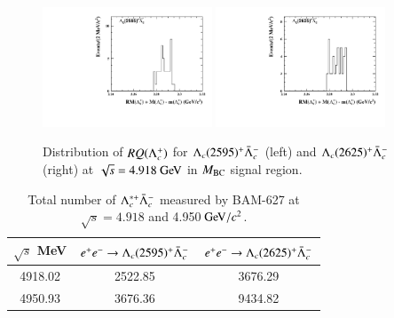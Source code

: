 \begin{figure}[H]\centering
    \includegraphics[width=0.45\textwidth]{figure/app_lcst/output_Lc2595_4914_rm_lmdc.pdf}
    \includegraphics[width=0.45\textwidth]{figure/app_lcst/output_Lc2625_4914_rm_lmdc.pdf}
    \caption{Distribution of $RQ(\Lambda_{c}^{+})$ for  $\Lambda_c(2595)^+\bar{\Lambda}_{c}^{-}$ (left) and $\Lambda_c(2625)^+\bar{\Lambda}_{c}^{-}$ (right) at $\sqrt{s} = 4.918\gev$ in $M_{\rm{BC}}$ signal region.}
\label{fig:mc_lcst_rm_lmdc}
\end{figure}

\begin{table}[H]
    \centering
    \caption{Total number of $\Lambda_c^{*+}\bar{\Lambda}_{c}^{-}$ measured by BAM-627 at $\sqrt{s}=4.918$ and 4.950$\gev/c^2$.}
    \label{tab:total_lcst}
    \begin{tabular}{c|c|c}
    \hline\hline
    $\sqrt{s}$ MeV & $e^+e^- \rightarrow \Lambda_c(2595)^+\bar{\Lambda}_{c}^{-}$ & $e^+e^- \rightarrow \Lambda_c(2625)^+\bar{\Lambda}_{c}^{-}$ \\\hline
    4918.02 & 2522.85 & 3676.29 \\\hline
    4950.93 & 3676.36 & 9434.82 \\
    \hline\hline
    \end{tabular}
\end{table}